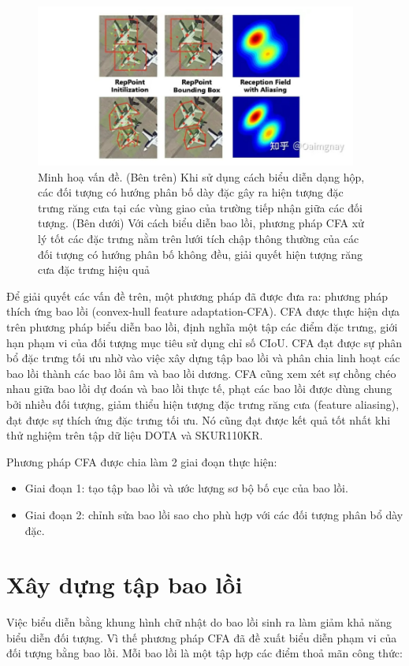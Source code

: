 \documentclass[12pt,a4paper,openany,oneside]{report}
\begin{document}
\begin{figure}[ht!]
	\begin{center}
		\includegraphics[width=400px]{./compare_cfa_with_other.JPG}
		\caption{Minh hoạ vấn đề. (Bên trên) Khi sử dụng cách biểu diễn dạng hộp, các đối tượng có hướng phân bố dày đặc gây ra hiện tượng đặc trưng răng cưa tại các vùng giao của trường tiếp nhận giữa các đối tượng. (Bên dưới) Với cách biểu diễn bao lồi, phương pháp CFA xử lý tốt các đặc trưng nằm trên lưới tích chập thông thường của các đối tượng có hướng phân bố không đều, giải quyết hiện tượng răng cưa đặc trưng hiệu quả}
		\label{fig_dhandang1}
	\end{center}
\end{figure} 


Để giải quyết các vấn đề trên, một phương pháp đã được đưa ra: phương pháp thích ứng bao lồi (convex-hull feature adaptation-CFA). CFA được thực hiện dựa trên phương pháp biểu diễn bao lồi, định nghĩa một tập các điểm đặc trưng, giới hạn phạm vi của đối tượng mục tiêu sử dụng chỉ số CIoU. CFA đạt được sự phân bổ đặc trưng tối ưu nhờ vào việc xây dựng tập bao lồi và phân chia linh hoạt các bao lồi thành các bao lồi âm và bao lồi dương. CFA cũng xem xét sự chồng chéo nhau giữa bao lồi dự đoán và bao lồi thực tế, phạt các bao lồi được dùng chung bởi nhiều đối tượng, giảm thiểu hiện tượng đặc trưng răng cưa (feature aliasing), đạt được sự thích ứng đặc trưng tối ưu. Nó cũng đạt được kết quả tốt nhất khi thử nghiệm trên tập dữ liệu DOTA và SKUR110KR.

Phương pháp CFA được chia làm 2 giai đoạn thực hiện:
\begin{itemize}
	\item Giai đoạn 1: tạo tập bao lồi và ước lượng sơ bộ bố cục của bao lồi.
	\item Giai đoạn 2: chỉnh sửa bao lồi sao cho phù hợp với các đối tượng phân bổ dày đặc.
\end{itemize}


\section{Xây dựng tập bao lồi}
Việc biểu diễn bằng khung hình chữ nhật do bao lồi sinh ra làm giảm khả năng biểu diễn đối tượng. Vì thế phương pháp CFA đã đề xuất biểu diễn phạm vi của đối tượng bằng bao lồi. Mỗi bao lồi là một tập hợp các điểm thoả mãn công thức:
\end{document}
